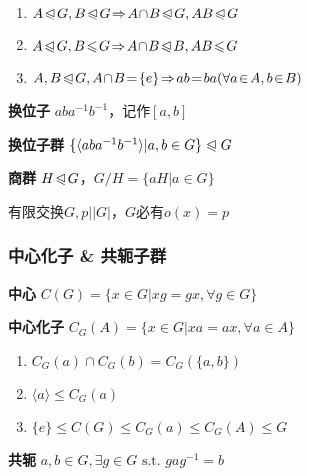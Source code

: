 \documentclass[b4paper, 10pt]{ctexart}
\newcommand*{\st}{\text{ s.t. }}
\newcommand*{\impl}{\Rightarrow}
\renewcommand*{\leq}{\leqslant}
\newcommand*{\nmsubgroupeq}{\trianglelefteqslant}
\newcommand*{\gengroup}[1]{\langle #1 \rangle}
\begin{document}
\begin{multicols}{3}
    \begin{theorem}[正规子群运算律]
        \hfil

        \begin{enumerate}
            \item $A \!\nmsubgroupeq\! G, B \!\nmsubgroupeq\! G \!\impl\! A \!\cap\! B \!\nmsubgroupeq\! G, AB \!\nmsubgroupeq\! G$
            \item $A \!\nmsubgroupeq\! G, B \!\leq\! G \!\impl\! A \!\cap\! B \!\nmsubgroupeq\! B, AB \!\leq\! G$
            \item $A, B \!\nmsubgroupeq\! G, A \!\cap\! B \! = \! \{e\} \!\impl\! ab \! = \! ba \\ (\forall a \!\in\! A, b \!\in\! B)$
        \end{enumerate}
    \end{theorem}

    \textbf{换位子} $aba^{-1}b^{-1}$，记作$[a,b]$

    \textbf{换位子群} $\{ \gengroup{aba^{-1}b^{-1}} | a, b \in G \} \nmsubgroupeq G$

    \textbf{商群} $H \!\nmsubgroupeq\! G$，$G/H = \{ aH | a \in G \}$

    \begin{theorem}[素阶元]
        有限交换$G, p||G|$，$G$必有$o(x) \! = \! p$
    \end{theorem}

    \subsubsection{中心化子 \& 共轭子群}

    \textbf{中心} $C(G) = \{ x \in G | xg = gx, \forall g \in G\}$

    \textbf{中心化子} $C_G(A) \! = \! \{x \!\in\! G | xa \! = \! ax, \forall a \!\in\! A\}$

    \begin{theorem}[中心化子性质]
        \hfil

        \begin{enumerate}
            \item $C_G(a) \cap C_G(b) = C_G(\{a, b\})$
            \item $\gengroup{a} \leq C_G(a)$
            \item $\{e\} \!\leq\! C(G) \!\leq\! C_G(a) \!\leq\! C_G(A) \!\leq\! G$
        \end{enumerate}
    \end{theorem}

    \textbf{共轭} $a, b \in G, \exists g \in G \st gag^{-1}=b$


\end{multicols}
\end{document}
